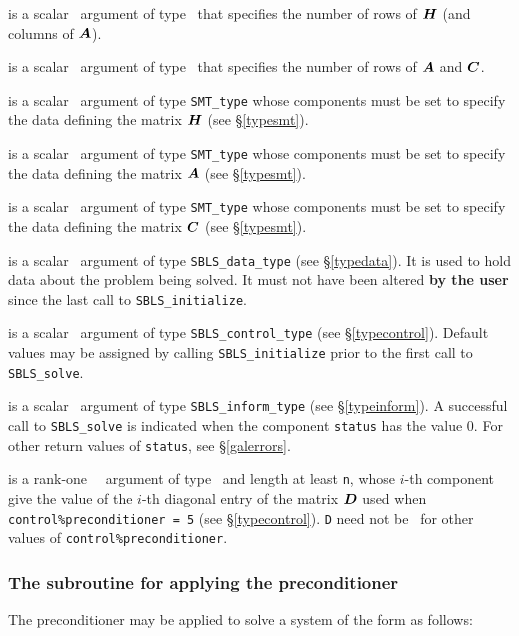 \documentclass{galahad}
\newcommand{\packagename}{SBLS}
\begin{document}
\begin{description}
 is a scalar \intentin\ argument of type \integer\ that specifies
the number of rows of ${\bm{H}}$ (and columns of ${\bm{A}}$).

 is a scalar \intentin\ argument of type \integer\ that specifies
the number of rows of ${\bm{A}}$ and ${\bm{C}}$.

 is a scalar \intentin\ argument of type {\tt SMT\_type} whose
components must be set to specify the data defining the matrix ${\bm{H}}$
(see \S\ref{typesmt}).

 is a scalar \intentin\ argument of type {\tt SMT\_type} whose
components must be set to specify the data defining the matrix ${\bm{A}}$
(see \S\ref{typesmt}).

 is a scalar \intentin\ argument of type {\tt SMT\_type} whose
components must be set to specify the data defining the matrix ${\bm{C}}$
(see \S\ref{typesmt}).

 is a scalar \intentinout\ argument of type
{\tt \packagename\_data\_type}
(see \S\ref{typedata}). It is used to hold data about the problem being
solved. It must not have been altered {\bf by the user} since the last call to
{\tt \packagename\_initialize}.

 is a scalar \intentin\ argument of type
{\tt \packagename\_control\_type}
(see \S\ref{typecontrol}). Default values may be assigned by calling
{\tt \packagename\_initialize} prior to the first call to
{\tt \packagename\_solve}.

 is a scalar \intentout\ argument of type
{\tt \packagename\_inform\_type}
(see \S\ref{typeinform}). A successful call to
{\tt \packagename\_solve}
is indicated when the  component {\tt status} has the value 0.
For other return values of {\tt status}, see \S\ref{galerrors}.

 is a rank-one \optional\ \intentin\ argument of type \realdp\
and length at least {\tt n}, whose $i$-th component give the value of the
$i$-th diagonal entry of the matrix ${\bm{D}}$ used when
{\tt control\%pre\-conditioner = 5} (see \S\ref{typecontrol}).
{\tt D} need not be \present\ for other values of {\tt control\%preconditio\-ner}.

\end{description}

\subsubsection{The subroutine for applying the preconditioner}
The preconditioner may be applied to solve a system of the
form  as follows:
\vspace*{1mm}
\end{document}
